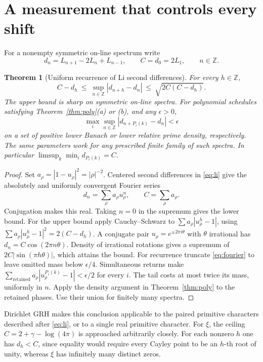 \documentclass[11pt,letterpaper]{article}
\newtheorem{theorem}{Theorem}
\newcommand{\Z}{\mathbb Z}
\begin{document}
\section{A measurement that controls every shift}
For a nonempty symmetric on-line spectrum write
\[
 d_n=L_{n+1}-2L_n+L_{n-1},\qquad C=d_0=2L_1,\qquad n\in\Z .
\]
\begin{theorem}[Uniform recurrence of Li second differences]\label{thm:curv}
For every \(h\in\Z\),
\begin{equation}
 C-d_h\ \le\ \sup_{n\in\Z}|d_{n+h}-d_n|
 \ \le\ \sqrt{2C(C-d_h)} . \label{eq:cert}
\end{equation}
The upper bound is sharp on symmetric on-line spectra. For polynomial schedules satisfying Theorem~\ref{thm:poly}\textup{(a)} or \textup{(b)}, and any \(\epsilon>0\),
\[
 \max_i\sup_{n\in\Z}|d_{n+P_i(k)}-d_n|<\epsilon
\]
on a set of positive lower Banach or lower relative prime density, respectively. The same parameters work for any prescribed finite family of such spectra. In particular \(\limsup_k\min_i d_{P_i(k)}=C\).
\end{theorem}
\begin{proof}
Set \(a_\rho=|1-u_\rho|^2=|\rho|^{-2}\). Centered second differences in \eqref{eq:li} give the absolutely and uniformly convergent Fourier series
\begin{equation}
 d_n=\sum_\rho a_\rho u_\rho^n,\qquad C=\sum_\rho a_\rho. \label{eq:fourier}
\end{equation}
Conjugation makes this real. Taking \(n=0\) in the supremum gives the lower bound. For the upper bound apply Cauchy--Schwarz to \(\sum a_\rho|u_\rho^h-1|\), using \(\sum a_\rho|u_\rho^h-1|^2=2(C-d_h)\). A conjugate pair \(u_\rho=e^{\pm2\pi i\theta}\) with \(\theta\) irrational has \(d_n=C\cos(2\pi n\theta)\). Density of irrational rotations gives a supremum of \(2C|\sin(\pi h\theta)|\), which attains the bound. For recurrence truncate \eqref{eq:fourier} to leave omitted mass below \(\epsilon/4\). Simultaneous returns make \(\sum_{\mathrm{retained}}a_\rho|u_\rho^{P_i(k)}-1|<\epsilon/2\) for every \(i\). The tail costs at most twice its mass, uniformly in \(n\). Apply the density argument in Theorem~\ref{thm:poly} to the retained phases. Use their union for finitely many spectra.
\end{proof}
Dirichlet GRH makes this conclusion applicable to the paired primitive characters described after \eqref{eq:li}, or to a single real primitive character. For \(\xi\), the ceiling \(C=2+\gamma-\log(4\pi)\) is approached arbitrarily closely. For each nonzero \(h\) one has \(d_h<C\), since equality would require every Cayley point to be an \(h\)-th root of unity, whereas \(\xi\) has infinitely many distinct zeros.



\end{document}
